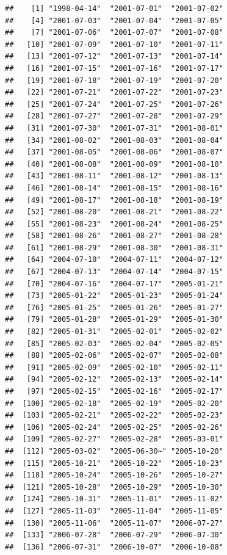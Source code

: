 \documentclass[10pt]{article}\usepackage[]{graphicx}\usepackage[]{color}
\makeatletter
\newenvironment{kframe}{%
 \def\at@end@of@kframe{}%
 \ifinner\ifhmode%
  \def\at@end@of@kframe{\end{minipage}}%
  \begin{minipage}{\columnwidth}%
 \fi\fi%
 \def\FrameCommand##1{\hskip\@totalleftmargin \hskip-\fboxsep
 \colorbox{shadecolor}{##1}\hskip-\fboxsep
     \hskip-\linewidth \hskip-\@totalleftmargin \hskip\columnwidth}%
 \MakeFramed {\advance\hsize-\width
   \@totalleftmargin\z@ \linewidth\hsize
   \@setminipage}}%
 {\par\unskip\endMakeFramed%
 \at@end@of@kframe}
\newenvironment{knitrout}{}{} %
\theoremstyle{plain}
\makeatother
\begin{document}
\begin{knitrout}
\color{fgcolor}\begin{kframe}
\begin{verbatim}
##    [1] "1998-04-14"  "2001-07-01"  "2001-07-02" 
##    [4] "2001-07-03"  "2001-07-04"  "2001-07-05" 
##    [7] "2001-07-06"  "2001-07-07"  "2001-07-08" 
##   [10] "2001-07-09"  "2001-07-10"  "2001-07-11" 
##   [13] "2001-07-12"  "2001-07-13"  "2001-07-14" 
##   [16] "2001-07-15"  "2001-07-16"  "2001-07-17" 
##   [19] "2001-07-18"  "2001-07-19"  "2001-07-20" 
##   [22] "2001-07-21"  "2001-07-22"  "2001-07-23" 
##   [25] "2001-07-24"  "2001-07-25"  "2001-07-26" 
##   [28] "2001-07-27"  "2001-07-28"  "2001-07-29" 
##   [31] "2001-07-30"  "2001-07-31"  "2001-08-01" 
##   [34] "2001-08-02"  "2001-08-03"  "2001-08-04" 
##   [37] "2001-08-05"  "2001-08-06"  "2001-08-07" 
##   [40] "2001-08-08"  "2001-08-09"  "2001-08-10" 
##   [43] "2001-08-11"  "2001-08-12"  "2001-08-13" 
##   [46] "2001-08-14"  "2001-08-15"  "2001-08-16" 
##   [49] "2001-08-17"  "2001-08-18"  "2001-08-19" 
##   [52] "2001-08-20"  "2001-08-21"  "2001-08-22" 
##   [55] "2001-08-23"  "2001-08-24"  "2001-08-25" 
##   [58] "2001-08-26"  "2001-08-27"  "2001-08-28" 
##   [61] "2001-08-29"  "2001-08-30"  "2001-08-31" 
##   [64] "2004-07-10"  "2004-07-11"  "2004-07-12" 
##   [67] "2004-07-13"  "2004-07-14"  "2004-07-15" 
##   [70] "2004-07-16"  "2004-07-17"  "2005-01-21" 
##   [73] "2005-01-22"  "2005-01-23"  "2005-01-24" 
##   [76] "2005-01-25"  "2005-01-26"  "2005-01-27" 
##   [79] "2005-01-28"  "2005-01-29"  "2005-01-30" 
##   [82] "2005-01-31"  "2005-02-01"  "2005-02-02" 
##   [85] "2005-02-03"  "2005-02-04"  "2005-02-05" 
##   [88] "2005-02-06"  "2005-02-07"  "2005-02-08" 
##   [91] "2005-02-09"  "2005-02-10"  "2005-02-11" 
##   [94] "2005-02-12"  "2005-02-13"  "2005-02-14" 
##   [97] "2005-02-15"  "2005-02-16"  "2005-02-17" 
##  [100] "2005-02-18"  "2005-02-19"  "2005-02-20" 
##  [103] "2005-02-21"  "2005-02-22"  "2005-02-23" 
##  [106] "2005-02-24"  "2005-02-25"  "2005-02-26" 
##  [109] "2005-02-27"  "2005-02-28"  "2005-03-01" 
##  [112] "2005-03-02"  "2005-06-30~" "2005-10-20" 
##  [115] "2005-10-21"  "2005-10-22"  "2005-10-23" 
##  [118] "2005-10-24"  "2005-10-26"  "2005-10-27" 
##  [121] "2005-10-28"  "2005-10-29"  "2005-10-30" 
##  [124] "2005-10-31"  "2005-11-01"  "2005-11-02" 
##  [127] "2005-11-03"  "2005-11-04"  "2005-11-05" 
##  [130] "2005-11-06"  "2005-11-07"  "2006-07-27" 
##  [133] "2006-07-28"  "2006-07-29"  "2006-07-30" 
##  [136] "2006-07-31"  "2006-10-07"  "2006-10-08" 

\end{verbatim}
\end{kframe}
\end{knitrout}
\end{document}
